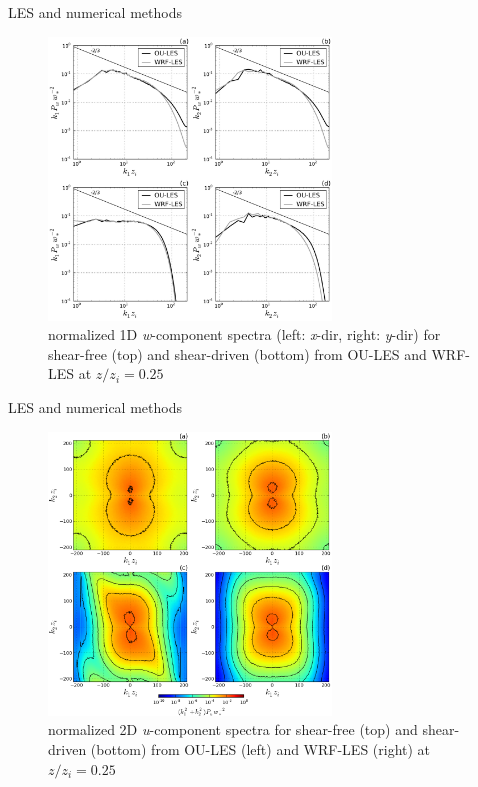 
\begin{frame}{LES and numerical methods}

\begin{figure}
	\includegraphics[width=0.67\textwidth]{gibbs4}
	\caption{\scriptsize normalized 1D \textit{w}-component spectra (left: \textit{x}-dir, right: \textit{y}-dir) for shear-free (top) and shear-driven (bottom) from OU-LES and WRF-LES at $z/z_i=0.25$}
\end{figure}

\end{frame}


\begin{frame}{LES and numerical methods}

\begin{figure}
	\includegraphics[width=0.67\textwidth]{gibbs5}
	\caption{\scriptsize normalized 2D \textit{u}-component spectra for shear-free (top) and shear-driven (bottom) from OU-LES (left) and WRF-LES (right) at $z/z_i=0.25$}
\end{figure}

\end{frame}

